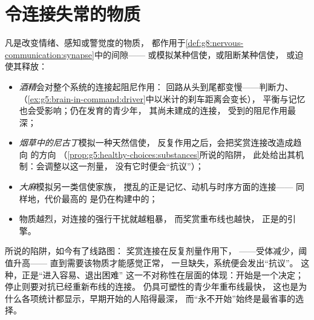 \section{令连接失常的物质}

\begin{proposition}[精神活性物质作用于突触]\label{prop:g8:protecting-the-nervous-system:substances}
凡是改变情绪、感知或警觉度的物质，
都作用于\cref{def:g8:nervous-communication:synapse}中的间隙——
或模拟某种信使，或阻断某种信使，
或迫使其释放：
\begin{itemize}
  \item \emph{酒精}会对整个系统的连接起阻尼作用：
        回路从头到尾都变慢——判断力、
        （\cref{ex:g5:brain-in-command:driver}中以米计的刹车距离会变长），
        平衡与记忆也会受影响；仍在发育的青少年，
        其尚未建成的连接，
        受到的阻尼作用最深；
  \item \emph{烟草中的尼古丁}模拟一种天然信使，
        反复作用之后，会把奖赏连接改造成趋向
        \emph{}的方向
        （\cref{prop:g5:healthy-choices:substances}所说的陷阱，
        此处给出其机制：会调整以这一剂量，
        没有它时便会“抗议”）；
  \item \emph{大麻}模拟另一类信使家族，
        搅乱的正是记忆、动机与时序方面的连接——
        同样地，代价最高的
        是仍在构建中的；
  \item 物质越烈，对连接的强行干扰就越粗暴，
        而奖赏重布线也越快，
        正是的引擎。
\end{itemize}
\end{proposition}
\admitted

\begin{remark}[成瘾的机制]\label{rem:g8:protecting-the-nervous-system:addiction}
所说的陷阱，如今有了线路图：
奖赏连接在反复剂量作用下，
\emph{}——受体减少，阈值升高——
直到需要该物质才能感觉正常，
一旦缺失，系统便会发出“抗议”。
这种，正是“进入容易、退出困难”
这一不对称性在层面的体现：开始是一个决定；
停止则要对抗已经重新布线的连接。
仍具可塑性的青少年重布线最快，
这也是为什么各项统计都显示，早期开始的人陷得最深，
而“永不开始”始终是最省事的选择。
\end{remark}

